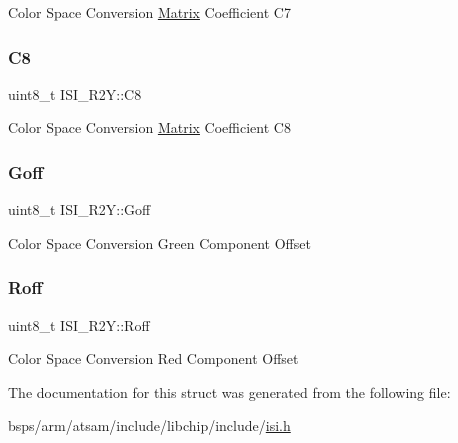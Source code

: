 Color Space Conversion \mbox{\hyperlink{structMatrix}{Matrix}} Coefficient C7 \mbox{\label{structISI__R2Y_a237e6f569066550bff5a6ebd8f8abb6e}} 
\subsubsection{\texorpdfstring{C8}{C8}}
{\footnotesize\ttfamily uint8\+\_\+t I\+S\+I\+\_\+\+R2\+Y\+::\+C8}

Color Space Conversion \mbox{\hyperlink{structMatrix}{Matrix}} Coefficient C8 \mbox{\label{structISI__R2Y_a1edcefe437bdb5d617a47049f4c96994}} 
\subsubsection{\texorpdfstring{Goff}{Goff}}
{\footnotesize\ttfamily uint8\+\_\+t I\+S\+I\+\_\+\+R2\+Y\+::\+Goff}

Color Space Conversion Green Component Offset \mbox{\label{structISI__R2Y_a97f211a83ababec03f30610fbfb8c067}} 
\subsubsection{\texorpdfstring{Roff}{Roff}}
{\footnotesize\ttfamily uint8\+\_\+t I\+S\+I\+\_\+\+R2\+Y\+::\+Roff}

Color Space Conversion Red Component Offset 

The documentation for this struct was generated from the following file\+:\begin{DoxyCompactItemize}
\item 
bsps/arm/atsam/include/libchip/include/\mbox{\hyperlink{isi_8h}{isi.\+h}}\end{DoxyCompactItemize}
